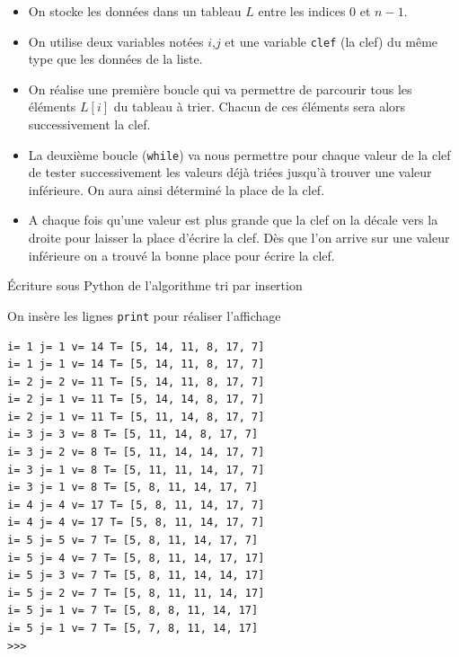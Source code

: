 \begin{itemize}
\item On stocke les données dans un tableau $L$ entre les indices $0$ et $n-1$.
\item On utilise deux variables notées $i$,$j$ et une variable \texttt{clef} (la clef) du même type que les données de la liste.
\item On réalise une première boucle qui va permettre de parcourir tous les éléments $L[i]$ du tableau à trier.
Chacun de ces éléments sera alors successivement la clef.
\item La deuxième boucle (\texttt{while}) va nous permettre pour chaque valeur de la clef de tester successivement les valeurs déjà triées jusqu'à trouver une valeur inférieure. On aura ainsi déterminé la place de la clef.
\item A chaque fois qu'une valeur est plus grande que la clef on la décale vers la droite pour laisser la place d'écrire la clef.
Dès que l'on arrive sur une valeur inférieure on a trouvé la bonne place pour écrire la clef.
\end{itemize}


\begin{algorithme}{Écriture sous Python de l'algorithme tri par insertion}

\begin{center}
		
\end{center}

\end{algorithme}

\begin{exemple2}



On insère les lignes \texttt{print} pour réaliser l'affichage


	\begin{DDbox}{\linewidth}
		\begin{verbatim}
i= 1 j= 1 v= 14 T= [5, 14, 11, 8, 17, 7]
i= 1 j= 1 v= 14 T= [5, 14, 11, 8, 17, 7]
i= 2 j= 2 v= 11 T= [5, 14, 11, 8, 17, 7]
i= 2 j= 1 v= 11 T= [5, 14, 14, 8, 17, 7]
i= 2 j= 1 v= 11 T= [5, 11, 14, 8, 17, 7]
i= 3 j= 3 v= 8 T= [5, 11, 14, 8, 17, 7]
i= 3 j= 2 v= 8 T= [5, 11, 14, 14, 17, 7]
i= 3 j= 1 v= 8 T= [5, 11, 11, 14, 17, 7]
i= 3 j= 1 v= 8 T= [5, 8, 11, 14, 17, 7]
i= 4 j= 4 v= 17 T= [5, 8, 11, 14, 17, 7]
i= 4 j= 4 v= 17 T= [5, 8, 11, 14, 17, 7]
i= 5 j= 5 v= 7 T= [5, 8, 11, 14, 17, 7]
i= 5 j= 4 v= 7 T= [5, 8, 11, 14, 17, 17]
i= 5 j= 3 v= 7 T= [5, 8, 11, 14, 14, 17]
i= 5 j= 2 v= 7 T= [5, 8, 11, 11, 14, 17]
i= 5 j= 1 v= 7 T= [5, 8, 8, 11, 14, 17]
i= 5 j= 1 v= 7 T= [5, 7, 8, 11, 14, 17]
>>> 
		\end{verbatim}
	\end{DDbox}



\end{exemple2}


